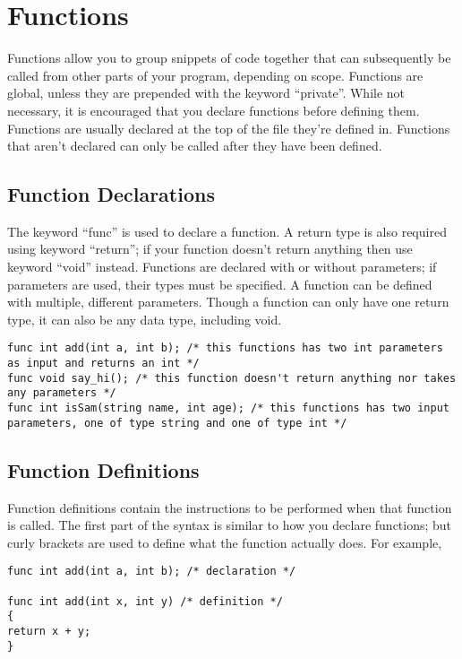 \documentclass{article}
\begin{document}
\section{Functions}
Functions allow you to group snippets of code together that can subsequently be called from other parts of your program, depending on scope. Functions are global, unless they are prepended with the keyword ``private''. While not necessary, it is encouraged that you declare functions before defining them. Functions are usually declared at the top of the file they're defined in. Functions that aren't declared can only be called after they have been defined. 

\subsection{Function Declarations}

The keyword ``func'' is used to declare a function. A return type is also required using keyword ``return''; if your function doesn't return anything then use keyword ``void'' instead.  Functions are declared with or without parameters; if parameters are used, their types must be specified. A function can be defined with multiple, different parameters. Though a function can only have one return type, it can also be any data type, including void.

\begin{lstlisting}
func int add(int a, int b); /* this functions has two int parameters as input and returns an int */
func void say_hi(); /* this function doesn't return anything nor takes any parameters */
func int isSam(string name, int age); /* this functions has two input parameters, one of type string and one of type int */

\end{lstlisting}

\subsection{Function Definitions}
Function definitions contain the instructions to be performed when that function is called. The first part of the syntax is similar to how you declare functions; but curly brackets are used to define what the function actually does. For example, 

\begin{lstlisting}
func int add(int a, int b); /* declaration */

func int add(int x, int y) /* definition */
{
return x + y;
}
\end{lstlisting}
\end{document}
